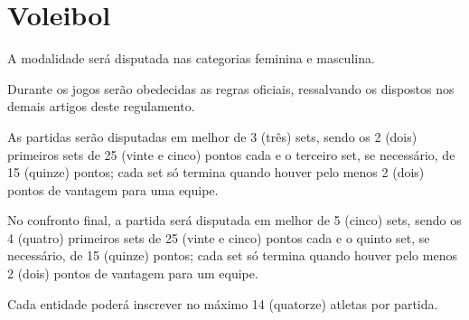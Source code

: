 {\let\clearpage\relax \chapter{Voleibol}}

\begin{article}
	A modalidade será disputada nas categorias feminina e masculina.
\end{article}

\begin{article}
	Durante os jogos serão obedecidas as regras oficiais, ressalvando os dispostos nos demais artigos deste regulamento.
\end{article}

\begin{article}
	As partidas serão disputadas em melhor de 3 (três) sets, sendo os 2 (dois) primeiros sets de 25 (vinte e cinco) pontos cada e o terceiro set, se necessário, de 15 (quinze) pontos; cada set só termina quando houver pelo menos 2 (dois) pontos de vantagem para uma equipe.

	\begin{xparagraph}
		No confronto final, a partida será disputada em melhor de 5 (cinco) sets, sendo os 4 (quatro) primeiros sets de 25 (vinte e cinco) pontos cada e o quinto set, se necessário, de 15 (quinze) pontos; cada set só termina quando houver pelo menos 2 (dois) pontos de vantagem para um equipe.
	\end{xparagraph}
\end{article}

\begin{article}
	Cada entidade poderá inscrever no máximo 14 (quatorze) atletas por partida.
\end{article}
